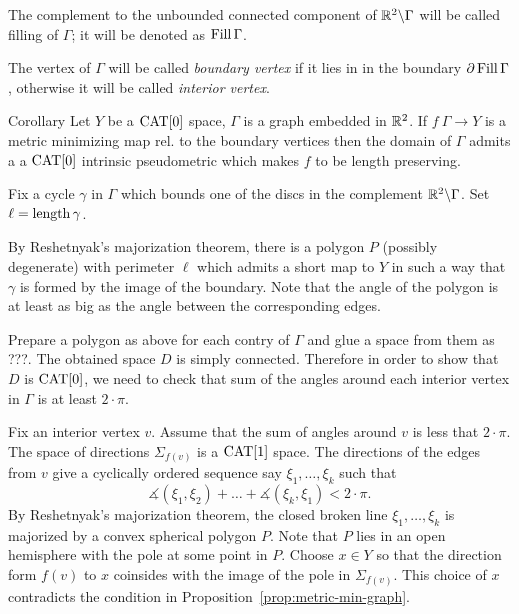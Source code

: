 \documentclass[a4paper,10pt]{amsart}
\begin{document}
The complement to the unbounded connected component of $\mathbb{R}^2\backslash\Gamma$ will be called filling of $\Gamma$;
it will be denoted as $\mathop{\rm Fill}\Gamma$.

The vertex of $\Gamma$ will be called \emph{boundary vertex}
if it lies in in the boundary $\partial\mathop{\rm Fill}\Gamma$,
otherwise it will be called \emph{interior vertex}.

\begin{thm}{Corollary}
Let $Y$ be a $\mathop{\rm CAT}\nolimits[0]$ space,
$\Gamma$ is a graph embedded in $\mathbb{R}^2$.
If $f\:\Gamma\to Y$ is a metric minimizing map rel. to the boundary vertices 
then the domain of $\Gamma$ admits a 
a $\mathop{\rm CAT}\nolimits[0]$ intrinsic pseudometric which makes $f$ to be length preserving.
\end{thm}

Fix a cycle $\gamma$ in $\Gamma$ which bounds one of the discs in the complement $\mathbb{R}^2\backslash \Gamma$.
Set $\ell=\mathop{\rm length}\nolimits\gamma$.

By Reshetnyak's majorization theorem, there is a polygon $P$ (possibly degenerate) with perimeter $\ell$ which admits a short map to $Y$ in such a way that $\gamma$ is formed by the image of the boundary.
Note that the angle of the polygon is at least as big as the angle between the corresponding edges.

Prepare a polygon as above for each contry of $\Gamma$
and glue a space from them as ???.
The obtained space $D$ is simply connected.
Therefore in order to show that $D$ is $\mathop{\rm CAT}\nolimits[0]$,
we need to check that sum of the angles around each interior vertex in $\Gamma$ is at least $2\cdot\pi$.

Fix an interior vertex $v$.
Assume that the sum of angles around $v$ is less that $2\cdot\pi$.
The space of directions $\Sigma_{f(v)}$ is a $\mathop{\rm CAT}\nolimits[1]$ space.
The directions of the edges from $v$ give a cyclically ordered sequence say $\xi_1,\dots,\xi_k$
such that
\[\measuredangle(\xi_1,\xi_2)+\dots+\measuredangle(\xi_k,\xi_1)<2\cdot\pi.\]
By Reshetnyak's majorization theorem,
the closed broken line $\xi_1,\dots,\xi_k$ is majorized by a convex spherical polygon $P$.
Note that $P$ lies in an open hemisphere with the pole  at some point in $P$.
Choose $x\in Y$ so that the direction form $f(v)$ to $x$ coinsides with the image of the pole in $\Sigma_{f(v)}$.
This choice of $x$ contradicts the condition in Proposition~\ref{prop:metric-min-graph}.\qeds
\end{document}
